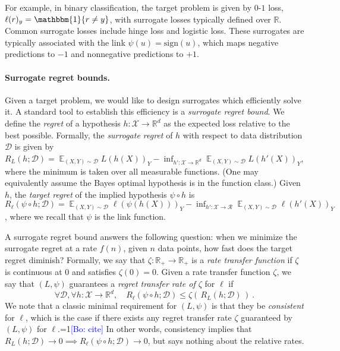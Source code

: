 \documentclass{article}
\newcommand{\Comments}{1}
\newcommand{\mynote}[2]{\ifnum\Comments=1\textcolor{#1}{#2}\fi}
\newcommand{\bo}[1]{\mynote{blue}{[Bo: #1]}}
\newcommand{\reals}{\mathbb{R}}
\newcommand{\D}{\mathcal{D}}
\DeclareMathOperator{\E}{\mathbb{E}}  %
\newcommand{\R}{\mathcal{R}}
\newcommand{\X}{\mathcal{X}}
\newcommand{\ones}{\mathbbm{1}}
\begin{document}
For example, in binary classification, the target problem is given by $0$-$1$ loss, $\ell(r)_y = \ones\{r\neq y\}$, with surrogate losses typically defined over $\reals$.
Common surrogate losses include hinge loss and logistic loss.
These surrogates are typically associated with the link $\psi(u) = \mathrm{sign}(u)$, which maps negative predictions to $-1$ and nonnegative predictions to $+1$.

\paragraph{Surrogate regret bounds.}
Given a target problem, we would like to design surrogates which efficiently solve it.
A standard tool to establish this efficiency is a \emph{surrogate regret bound}.
We define the \emph{regret} of a hypothesis $h: \X \to \reals^d$ as the expected loss relative to the best possible.
Formally, the \emph{surrogate regret} of $h$ with respect to data distribution $\D$ is given by $R_L(h;\D) = \E_{(X,Y)\sim\D} L(h(X))_Y - \inf_{h':\X\to\reals^d} \E_{(X,Y)\sim\D} L(h'(X))_Y$, where the minimum is taken over all measurable functions.
(One may equivalently assume the Bayes optimal hypothesis is in the function class.)
Given $h$, the \emph{target regret} of the implied hypothesis $\psi \circ h$ is $R_\ell(\psi\circ h;\D) = \E_{(X,Y)\sim\D} \ell(\psi(h(X)))_Y - \inf_{h':\X\to\R} \E_{(X,Y)\sim\D} \ell(h'(X))_Y$, where we recall that $\psi$ is the link function.


A surrogate regret bound answers the following question: when we minimize the surrogate regret at a rate $f(n)$, given $n$ data points, how fast does the target regret diminish?
Formally, we say that $\zeta : \reals_+ \to \reals_+$ is a \emph{rate transfer function} if $\zeta$ is continuous at $0$ and satisfies $\zeta(0) = 0$.
Given a rate transfer function $\zeta$, we say that $(L,\psi)$ guarantees a \emph{regret transfer rate of $\zeta$} for $\ell$ if
\begin{equation}
  \label{eq:surrogate-regret-bound}
  \forall \D, \forall h:\X\to\reals^d, \quad R_\ell(\psi\circ h;\D) \leq \zeta(\, R_L(h;\D) \,)~.
\end{equation}
We note that a classic minimal requirement for $(L,\psi)$ is that they be \emph{consistent} for $\ell$, which is the case if there exists any regret transfer rate $\zeta$ guaranteed by $(L,\psi)$ for $\ell$.\bo{cite}
In other words, consistency implies that $R_L(h;\D) \to 0 \implies R_{\ell}(\psi \circ h;\D) \to 0$, but says nothing about the relative rates.
\end{document}
